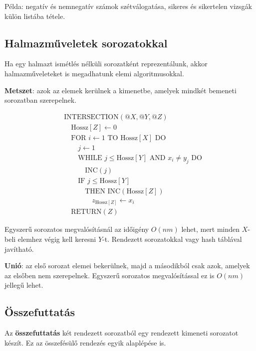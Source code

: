 Példa: negatív és nemnegatív számok szétválogatása, sikeres és sikertelen vizsgák külön listába tétele.

\subsection{Halmazműveletek sorozatokkal}

Ha egy halmazt ismétlés nélküli sorozatként reprezentálunk, akkor halmazműveleteket is megadhatunk elemi algoritmusokkal.

\textbf{Metszet}: azok az elemek kerülnek a kimenetbe, amelyek mindkét bemeneti sorozatban szerepelnek.

\[
\begin{aligned}
&\text{INTERSECTION}(@X,@Y,@Z)\\
&\quad \text{Hossz}[Z]\leftarrow 0\\
&\quad \text{FOR } i\leftarrow 1 \text{ TO Hossz}[X] \text{ DO}\\
&\quad\quad j\leftarrow 1\\
&\quad\quad \text{WHILE } j\leq \text{Hossz}[Y] \text{ AND } x_i\neq y_j \text{ DO}\\
&\quad\quad\quad \text{INC}(j)\\
&\quad\quad \text{IF } j\leq \text{Hossz}[Y]\\
&\quad\quad\quad \text{THEN INC}(\text{Hossz}[Z])\\
&\quad\quad\quad\quad z_{\text{Hossz}[Z]}\leftarrow x_i\\
&\quad \text{RETURN}(Z)
\end{aligned}
\]

Egyszerű sorozatos megvalósításnál az időigény $O(nm)$ lehet, mert minden $X$-beli elemhez végig kell keresni $Y$-t. Rendezett sorozatokkal vagy hash táblával javítható.

\textbf{Unió}: az első sorozat elemei bekerülnek, majd a másodikból csak azok, amelyek az elsőben nem szerepelnek. Egyszerű sorozatos megvalósítással ez is $O(nm)$ jellegű lehet.

\subsection{Összefuttatás}

Az \textbf{összefuttatás} két rendezett sorozatból egy rendezett kimeneti sorozatot készít. Ez az összefésülő rendezés egyik alaplépése is.


